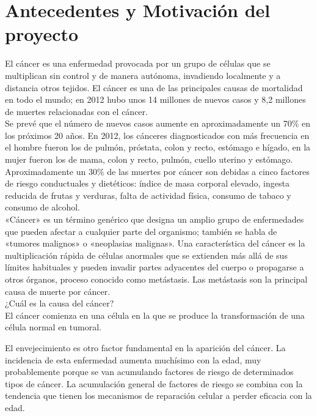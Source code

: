 \documentclass[../pfc.tex]{subfiles}
\begin{document}
\section{Antecedentes y Motivación del proyecto}
El cáncer es una enfermedad provocada por un grupo de células que se multiplican sin control y de manera autónoma, invadiendo localmente y a distancia otros tejidos. El cáncer es una de las principales causas de mortalidad en todo el mundo; en 2012 hubo unos 14 millones de nuevos casos y 8,2 millones de muertes relacionadas con el cáncer.\\

Se prevé que el número de nuevos casos aumente en aproximadamente un 70\% en los próximos 20 años. En 2012, los cánceres diagnosticados con más frecuencia en el hombre fueron los de pulmón, próstata, colon y recto, estómago e hígado, en la mujer fueron los de mama, colon y recto, pulmón, cuello uterino y estómago.\\

Aproximadamente un 30\% de las muertes por cáncer son debidas a cinco factores de riesgo conductuales y dietéticos: índice de masa corporal elevado, ingesta reducida de frutas y verduras, falta de actividad física, consumo de tabaco y consumo de alcohol.\\

«Cáncer» es un término genérico que designa un amplio grupo de enfermedades que pueden afectar a cualquier parte del organismo; también se habla de «tumores malignos» o «neoplasias malignas». Una característica del cáncer es la multiplicación rápida de células anormales que se extienden más allá de sus límites habituales y pueden invadir partes adyacentes del cuerpo o propagarse a otros órganos, proceso conocido como metástasis. Las metástasis son la principal causa de muerte por cáncer.\\

¿Cuál es la causa del cáncer?\\
El cáncer comienza en una célula en la que se produce la transformación de una célula normal en tumoral.

El envejecimiento es otro factor fundamental en la aparición del cáncer. La incidencia de esta enfermedad aumenta muchísimo con la edad, muy probablemente porque se van acumulando factores de riesgo de determinados tipos de cáncer. La acumulación general de factores de riesgo se combina con la tendencia que tienen los mecanismos de reparación celular a perder eficacia con la edad.\\
\end{document}

